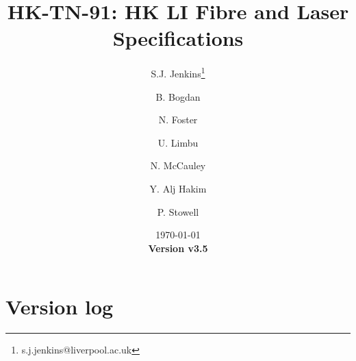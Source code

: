 \documentclass[a4paper,11pt]{article}
\begin{document}
\title{\huge{HK-TN-91: HK LI Fibre and Laser Specifications}}
\author[1]{S.J. Jenkins\footnote{s.j.jenkins@liverpool.ac.uk}}
\author[1]{B. Bogdan}
\author[1]{N. Foster}
\author[1]{U. Limbu}
\author[1]{N. McCauley}
\author[2]{Y. Alj Hakim}
\author[2]{P. Stowell}
\date{\today\\
{\bf Version v3.5}}

\maketitle

\tableofcontents

\newpage

\section{Version log}
\end{document}
